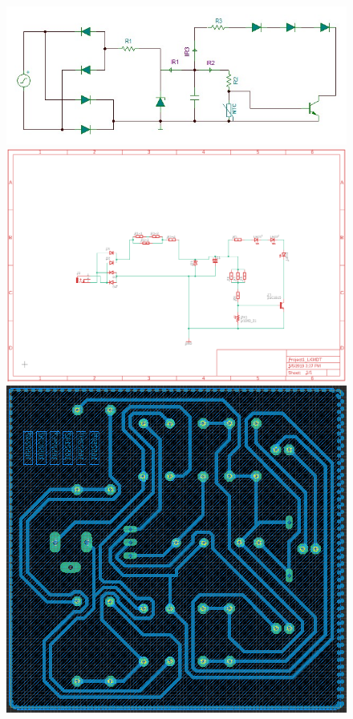 \documentclass[12pt]{extarticle}
\newcommand{\<}{\langle}
\renewcommand{\>}{\rangle}
\theoremstyle{definition}
\begin{document}
\begin{figure}[ht]
		\begin{center}
			
			\includegraphics[scale=0.75]{PROJECT.JPG}\\[0,5cm]
			\includegraphics[scale=0.5]{sch.PNG}\\[0,5cm]
			\includegraphics[scale=0.5]{Board.PNG}\\[0,5cm]
		\end{center}
\end{figure}
\end{document}
